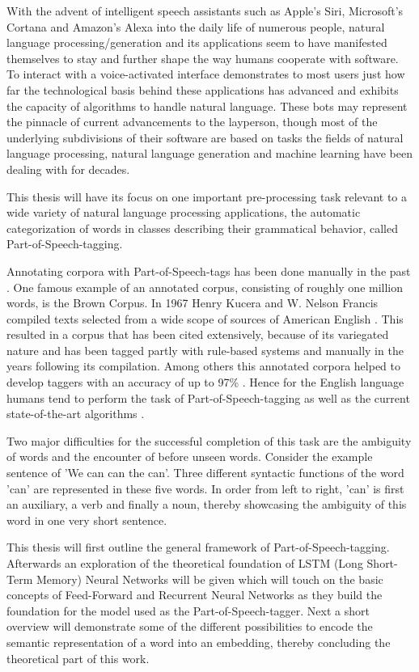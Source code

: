 With the advent of intelligent speech assistants such as Apple's Siri, Microsoft's Cortana and Amazon's Alexa into the daily life of numerous people, natural language processing/generation and its applications seem to have manifested themselves to stay and further shape the way humans cooperate with software. To interact with a voice-activated interface demonstrates to most users just how far the technological basis behind these applications has advanced and exhibits the capacity of algorithms to handle natural language. These bots may represent the pinnacle of current advancements to the layperson, though most of the underlying subdivisions of their software are based on tasks the fields of natural language processing, natural language generation and machine learning have been dealing with for decades. 

This thesis will have its focus on one important pre-processing task relevant to a wide variety of natural language processing applications, the automatic categorization of words in classes describing their grammatical behavior, called Part-of-Speech-tagging.

Annotating corpora with Part-of-Speech-tags has been done manually in the past \citep{martinez2012part}. One famous example of an annotated corpus, consisting of roughly one million words, is the Brown Corpus. In 1967 Henry Kucera and W. Nelson Francis compiled texts selected from a wide scope of sources of American English \citep{kucera1967brown}. This resulted in a corpus that has been cited extensively, because of its variegated nature and has been tagged partly with rule-based systems \citep{schmid1994part} and manually in the years following its compilation. Among others this annotated corpora helped to develop taggers with an accuracy of up to 97\% \citep{jurafsky2021}. Hence for the English language humans tend to perform the task of Part-of-Speech-tagging as well as the current state-of-the-art algorithms \citep{manning2011part}.

Two major difficulties for the successful completion of this task are the ambiguity of words and the encounter of before unseen words. Consider the example sentence of \cite{martinez2012part} 'We can can the can'. Three different syntactic functions of the word 'can' are represented in these five words. In order from left to right, 'can' is first an auxiliary, a verb and finally a noun, thereby showcasing the ambiguity of this word in one very short sentence.  

This thesis will first outline the general framework of Part-of-Speech-tagging. Afterwards an exploration of the theoretical foundation of LSTM (Long Short-Term Memory) Neural Networks will be given which will touch on the basic concepts of Feed-Forward and Recurrent Neural Networks as they build the foundation for the model used as the Part-of-Speech-tagger. Next a short overview will demonstrate some of the different possibilities to encode the semantic representation of a word into an embedding, thereby concluding the theoretical part of this work.

